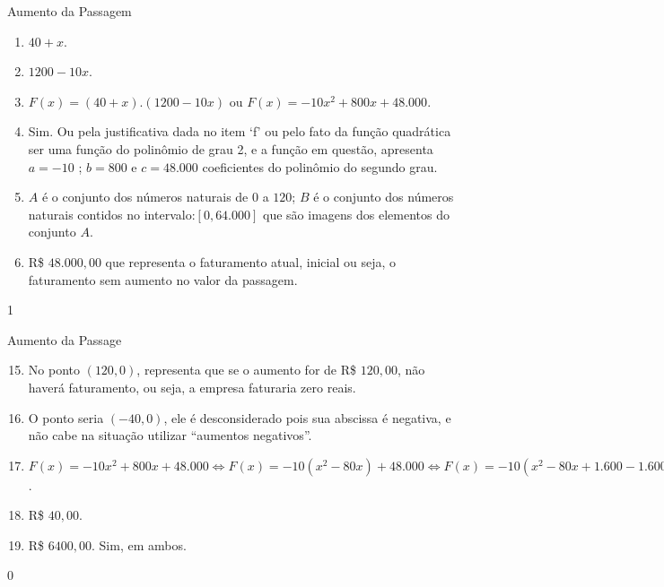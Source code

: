 \begin{answer}{Aumento da Passagem}
{\begin{enumerate}
\item {} 
\(40+x\).

\item {} 
\(1 200 - 10x\).

\item {} 
\(F(x)=(40+x).(1200-10x)\) ou \(F(x)=-10x^2+800x+48.000\).

\item {} 
Sim. Ou pela justificativa dada no item ‘f’ ou pelo fato da função quadrática ser uma função do polinômio de grau 2, e a função em questão, apresenta \(a=-10\) ; \(b=800\) e \(c=48.000\) coeficientes do polinômio do segundo grau.


\item {} 
\(A\) é o conjunto dos números naturais de \(0\) a \(120\); \(B\) é o conjunto dos números naturais contidos no intervalo:\([0,64.000]\) que são imagens dos elementos do conjunto \(A\).

\item {} 
R\$ \(48.000{,}00\) que representa o faturamento atual, inicial ou seja, o faturamento sem aumento no valor da passagem.


\end{enumerate}
}{1}
\end{answer}
\begin{answer}{Aumento da Passage}
{
\begin{enumerate}\setcounter{enumi}{14}

\item {} 
No ponto \((120,0)\), representa que se o aumento for de R\$ \(120,00\), não haverá faturamento, ou seja, a empresa faturaria zero reais.

\item {} 
O ponto seria \((-40,0)\), ele é desconsiderado pois sua abscissa é negativa, e não cabe na situação utilizar “aumentos negativos”.

\item \(F(x)=-10x^2+800x+48.000\iff F(x)=-10(x^2-80x)+48.000\iff F(x)=-10(x^2-80x+1.600-1.600)+48.000\iff F(x)=-10(x-40)^2+16.000+48.000
\iff F(x)=-10(x-40)^2+64.000\).

\item {} 
R\$ \(40{,}00\).

\item {} 
R\$ \(6400{,}00\). Sim, em ambos.
\end{enumerate}
}{0}
\end{answer}
